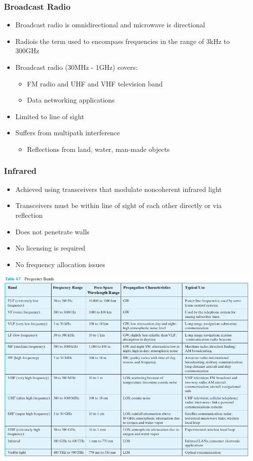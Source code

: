 \documentclass[pdflatex,compress]{beamer}
\begin{document}
\begin{frame}
	\frametitle{Broadcast Radio}
	\begin{itemize}
		\item Broadcast radio is omnidirectional and microwave is directional
		\item Radiois the term used to encompass frequencies in the range of 3kHz to 300GHz
		\item Broadcast radio (30MHz - 1GHz) covers:
		\begin{itemize}
			\item FM radio and UHF and VHF television band
			\item Data networking applications
		\end{itemize}
		\item Limited to
		line of sight
		\item Suffers from multipath interference
		\begin{itemize}
			\item Reflections from land, water, man-made objects
		\end{itemize}
	\end{itemize}
\end{frame}

\begin{frame}
	\frametitle{Infrared}
	\begin{itemize}
		\item Achieved using transceivers that modulate noncoherent infrared light
		\item Transceivers must be within line of sight of each other directly or via reflection
		\item Does not penetrate walls
		\item No licensing is required
		\item No frequency allocation issues
	\end{itemize}
\end{frame}

\begin{frame}
	\begin{center}
		\includegraphics[width=0.8\linewidth]{img/img22}
	\end{center}
\end{frame}
\end{document}
